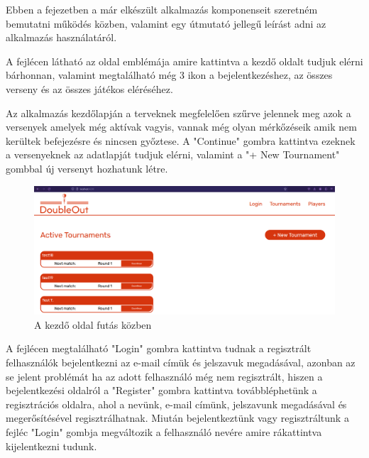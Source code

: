 
Ebben a fejezetben a már elkészült alkalmazás komponenseit szeretném bemutatni működés közben, valamint egy útmutató jellegű leírást adni az alkalmazás használatáról.\newline

A fejlécen látható az oldal emblémája amire kattintva a kezdő oldalt tudjuk elérni bárhonnan, valamint megtalálható még 3 ikon a bejelentkezéshez, az összes verseny és az összes játékos eléréséhez.\newline

Az alkalmazás kezdőlapján a terveknek megfelelően szűrve jelennek meg azok a versenyek amelyek még aktívak vagyis, vannak még olyan mérkőzéseik amik nem kerültek befejezésre és nincsen győztese. A "Continue" gombra kattintva ezeknek a versenyeknek az adatlapját tudjuk elérni, valamint a "+ New Tournament" gombbal új versenyt hozhatunk létre.

\begin{figure}[h]
\centering
\includegraphics[scale=0.3]{images/HomeTest.png}
\caption{A kezdő oldal futás közben}
\label{fig:homeTest}
\end{figure}

A fejlécen megtalálható "Login" gombra kattintva tudnak a regisztrált felhasználók bejelentkezni az e-mail címük és jelszavuk megadásával, azonban az se jelent problémát ha az adott felhasználó még nem regisztrált, hiszen a bejelentkezési oldalról a "Register" gombra kattintva továbbléphetünk a regisztrációs oldalra, ahol a nevünk, e-mail címünk, jelszavunk megadásával és megerősítésével regisztrálhatnak. Miután bejelentkeztünk vagy regisztráltunk a fejléc "Login" gombja megváltozik a felhasználó nevére amire rákattintva kijelentkezni tudunk.

